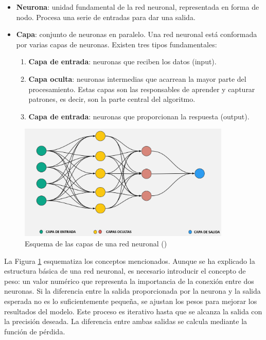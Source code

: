 \documentclass[12pt,a4paper]{report}
\begin{document}
\begin{itemize}
    \item \textbf{Neurona}: unidad fundamental de la red neuronal, representada en forma de nodo. Procesa una serie de entradas para dar una salida.

    \item \textbf{Capa}: conjunto de neuronas en paralelo. Una red neuronal está conformada por varias capas de neuronas. Existen tres tipos fundamentales:

        \begin{enumerate}
            \item \textbf{Capa de entrada}: neuronas que reciben los datos (input).

            \item \textbf{Capa oculta}: neuronas intermedias que acarrean la mayor parte del procesamiento. Estas capas son las responsables de aprender y capturar patrones, es decir, son la parte central del algoritmo.

            \item \textbf{Capa de entrada}: neuronas que proporcionan la respuesta (output).
        \end{enumerate}
\end{itemize}

\begin{figure}[H]
    \centering
    \includegraphics[width=0.9\textwidth]{Images/tfm-2.9.png}
    \caption{Esquema de las capas de una red neuronal (\cite{fouzan2023understanding})}
    \label{fig:ANN}
\end{figure}

La Figura \ref{fig:ANN} esquematiza los conceptos mencionados. Aunque se ha explicado la estructura básica de una red neuronal, es necesario introducir el concepto de peso: un valor numérico que representa la importancia de la conexión entre dos neuronas. Si la diferencia entre la salida proporcionada por la neurona y la salida esperada no es lo suficientemente pequeña, se ajustan los pesos para mejorar los resultados del modelo. Este proceso es iterativo hasta que se alcanza la salida con la precisión deseada. La diferencia entre ambas salidas se calcula mediante la función de pérdida.
\end{document}
